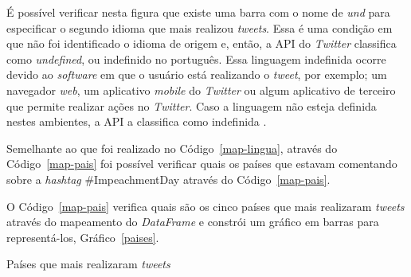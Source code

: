 É possível verificar nesta figura que existe uma barra com o nome de \textit{und} para especificar o segundo idioma que mais realizou \textit{tweets}. Essa é uma condição em que não foi identificado o idioma de origem e, então, a API do \textit{Twitter} classifica como \textit{undefined}, ou indefinido no português. Essa linguagem indefinida ocorre devido ao \textit{software} em que o usuário está realizando o \textit{tweet}, por exemplo; um navegador \textit{web}, um aplicativo \textit{mobile} do \textit{Twitter} ou algum aplicativo de terceiro que permite realizar ações no \textit{Twitter}. Caso a linguagem não esteja definida nestes ambientes, a API a classifica como indefinida \cite{twitter-doc}.

Semelhante ao que foi realizado no Código~\ref{map-lingua}, através do Código~\ref{map-pais} foi possível verificar quais os países que estavam comentando sobre a \textit{hashtag} \#ImpeachmentDay através do Código~\ref{map-pais}.



O Código~\ref{map-pais} verifica quais são os cinco países que mais realizaram \textit{tweets} através do mapeamento do \textit{DataFrame} e constrói um gráfico em barras para representá-los, Gráfico~\ref{paises}.

\begin{grafico}[h]
	\centering
	\caption{Países que mais realizaram \textit{tweets}}
	\vspace{-0.3cm}
	\label{paises}
\end{grafico}

